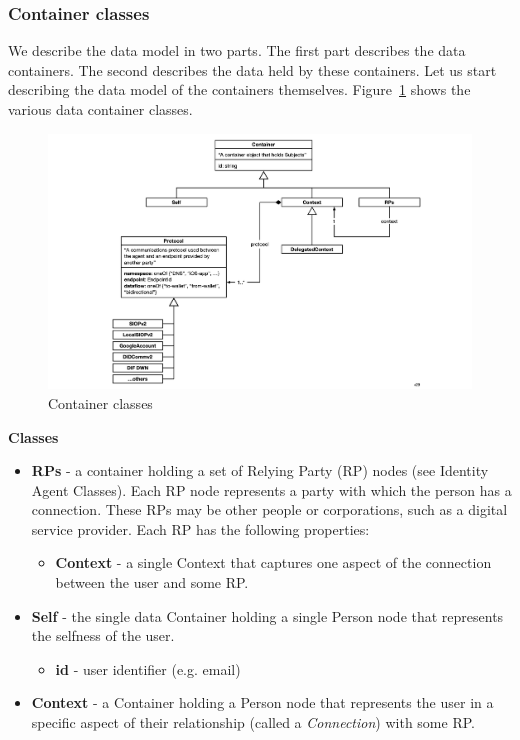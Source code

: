 \documentclass[11pt, oneside]{article}   	%
\begin{document}
\subsubsection{Container classes}

We describe the data model in two parts. The first part describes the data containers. The second describes the data held by these containers. Let us start describing the data model of the containers themselves. Figure~\ref{fig:containers} shows the various data container classes. 

\begin{figure}[h!]
\includegraphics[width=\textwidth]{./images/container-classes.png}
\caption{Container classes}
\label{fig:containers}
\end{figure} 

\textbf{Classes}

\begin{itemize}
	\item \textbf{RPs} - a container holding a set of Relying Party (RP) nodes (see Identity Agent Classes). Each RP node represents a party with which the person has a connection. These RPs may be other people or corporations, such as a digital service provider. Each RP has the following properties:
	\begin{itemize}
		\item \textbf{Context} - a single Context that captures one aspect of the connection between the user and some RP.
	\end{itemize}
	\item \textbf{Self} - the single data Container holding a single Person node that represents the selfness of the user.
	\begin{itemize}
		\item \textbf{id} - user identifier (e.g. email)
	\end{itemize}
	\item \textbf{Context} - a Container holding a Person node that represents the user in a specific aspect of their relationship (called a \emph{Connection}) with some RP. 
\end{itemize}
\end{document}
